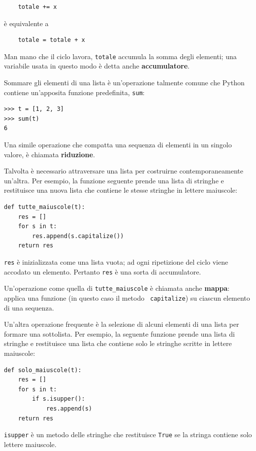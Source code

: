 \documentclass[10pt]{book}
\begin{document}
\begin{verbatim}
    totale += x
\end{verbatim}
%
è equivalente a

\begin{verbatim}
    totale = totale + x
\end{verbatim}
%
Man mano che il ciclo lavora, {\tt totale} accumula la somma degli elementi; una variabile usata in questo modo è detta anche {\bf accumulatore}.

Sommare gli elementi di una lista è un'operazione talmente comune che Python contiene un'apposita funzione predefinita, {\tt sum}:

\begin{verbatim}
>>> t = [1, 2, 3]
>>> sum(t)
6
\end{verbatim}
%
Una simile operazione che compatta una sequenza di elementi in un singolo valore, è chiamata {\bf riduzione}.

Talvolta è necessario attraversare una lista per costruirne contemporaneamente un'altra. Per esempio, la funzione seguente prende una lista di stringhe e restituisce una nuova lista che contiene le stesse stringhe in lettere maiuscole:

\begin{verbatim}
def tutte_maiuscole(t):
    res = []
    for s in t:
        res.append(s.capitalize())
    return res
\end{verbatim}
%
{\tt res} è inizializzata come una lista vuota; ad ogni ripetizione del ciclo viene accodato un elemento. Pertanto {\tt res} è una sorta di accumulatore.

Un'operazione come quella di \verb"tutte_maiuscole" è chiamata anche {\bf
mappa}: applica una funzione (in questo caso il metodo {\tt
capitalize}) su ciascun elemento di una sequenza.

Un'altra operazione frequente è la selezione di alcuni elementi di una lista per formare una sottolista. Per esempio, la seguente funzione prende una lista di stringhe e restituisce una lista che contiene solo le stringhe scritte in lettere maiuscole:

\begin{verbatim}
def solo_maiuscole(t):
    res = []
    for s in t:
        if s.isupper():
            res.append(s)
    return res
\end{verbatim}
%
{\tt isupper} è un metodo delle stringhe che restituisce {\tt True} se la stringa contiene solo lettere maiuscole.
\end{document}

